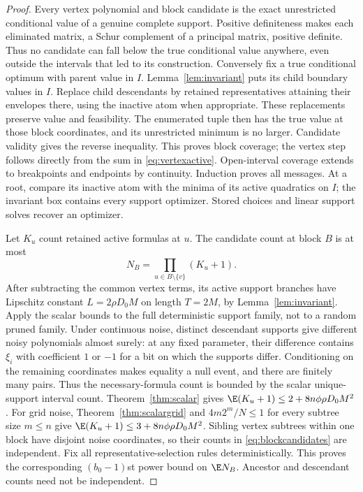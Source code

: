 \begin{proof}
Every vertex polynomial and block candidate is the exact unrestricted
conditional value of a genuine complete support. Positive definiteness
makes each eliminated matrix, a Schur complement of a principal matrix,
positive definite. Thus no candidate can fall below the true conditional
value anywhere, even outside the intervals that led to its construction.
Conversely fix a true conditional optimum with parent value in $I$.
Lemma~\ref{lem:invariant} puts its child boundary values in $I$. Replace
child descendants by retained representatives attaining their envelopes
there, using the inactive atom when appropriate. These replacements preserve
value and feasibility. The enumerated tuple then has the true value at those
block coordinates, and its unrestricted minimum is no larger. Candidate
validity gives the reverse inequality. This proves block coverage; the
vertex step follows directly from the sum in \eqref{eq:vertexactive}.
Open-interval coverage extends to breakpoints and endpoints by continuity.
Induction proves all messages. At a root, compare its inactive atom with the
minima of its active quadratics on $I$; the invariant box contains every
support optimizer. Stored choices and linear support solves recover an
optimizer.

Let $K_u$ count retained active formulas at $u$. The candidate count at
block $B$ is at most
\begin{equation}\label{eq:blockcandidates}
 N_B=\prod_{u\in B\setminus\{v\}}(K_u+1).
\end{equation}
After subtracting the common vertex terms, its active support branches have
Lipschitz constant $L=2\rho D_0M$ on length $T=2M$, by
Lemma~\ref{lem:invariant}. Apply the scalar bounds to the full deterministic
support family, not to a random pruned family. Under continuous noise,
distinct descendant supports give different noisy polynomials almost surely:
at any fixed parameter, their difference contains $\xi_i$ with coefficient
$1$ or $-1$ for a bit on which the supports differ. Conditioning on the
remaining coordinates
makes equality a null event, and there are finitely many pairs. Thus the
necessary-formula count is bounded by the scalar unique-support interval
count. Theorem~\ref{thm:scalar} gives
$\E(K_u+1)\le2+8n\phi\rho D_0M^2$.
For grid noise, Theorem~\ref{thm:scalargrid} and
$4m2^m/N\le1$ for every subtree size $m\le n$ give
$\E(K_u+1)\le3+8n\phi\rho D_0M^2$.
Sibling vertex subtrees within one block have disjoint noise coordinates,
so their counts in \eqref{eq:blockcandidates} are independent. Fix all
representative-selection rules deterministically. This proves the corresponding
$(b_0-1)$st power bound on $\E N_B$. Ancestor and descendant counts
need not be independent.


\end{proof}
